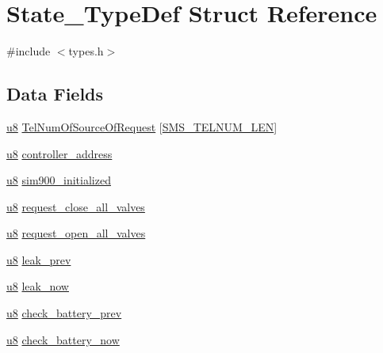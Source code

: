 \hypertarget{struct_state___type_def}{}\section{State\+\_\+\+Type\+Def Struct Reference}
\label{struct_state___type_def}


{\ttfamily \#include $<$types.\+h$>$}

\subsection*{Data Fields}
\begin{DoxyCompactItemize}
\item 
\hyperlink{types_8h_aed742c436da53c1080638ce6ef7d13de}{u8} \hyperlink{struct_state___type_def_aea371b8e2fc5d5672a74400e51c07082}{Tel\+Num\+Of\+Source\+Of\+Request} \mbox{[}\hyperlink{types_8h_a5e892833bdd80f5cb5cb76edc5cfa7e1}{S\+M\+S\+\_\+\+T\+E\+L\+N\+U\+M\+\_\+\+L\+E\+N}\mbox{]}
\item 
\hyperlink{types_8h_aed742c436da53c1080638ce6ef7d13de}{u8} \hyperlink{struct_state___type_def_aa213b6c0056af4acf9d9822500268845}{controller\+\_\+address}
\item 
\hyperlink{types_8h_aed742c436da53c1080638ce6ef7d13de}{u8} \hyperlink{struct_state___type_def_ad835df12f253f7af0950569385d10f81}{sim900\+\_\+initialized}
\item 
\hyperlink{types_8h_aed742c436da53c1080638ce6ef7d13de}{u8} \hyperlink{struct_state___type_def_a60d935b4b3b64b197fcc297d3acd6cb3}{request\+\_\+close\+\_\+all\+\_\+valves}
\item 
\hyperlink{types_8h_aed742c436da53c1080638ce6ef7d13de}{u8} \hyperlink{struct_state___type_def_a3a3570de9c4c52156ee1bfeabf813aa3}{request\+\_\+open\+\_\+all\+\_\+valves}
\item 
\hyperlink{types_8h_aed742c436da53c1080638ce6ef7d13de}{u8} \hyperlink{struct_state___type_def_aa167dc6fdc2b1bc25006ac551d641f3c}{leak\+\_\+prev}
\item 
\hyperlink{types_8h_aed742c436da53c1080638ce6ef7d13de}{u8} \hyperlink{struct_state___type_def_a2e6ddafab1772039a1c3e2f8902a50bd}{leak\+\_\+now}
\item 
\hyperlink{types_8h_aed742c436da53c1080638ce6ef7d13de}{u8} \hyperlink{struct_state___type_def_a21e7075e9496f30d865d7aa6035bea77}{check\+\_\+battery\+\_\+prev}
\item 
\hyperlink{types_8h_aed742c436da53c1080638ce6ef7d13de}{u8} \hyperlink{struct_state___type_def_af37e06b0479230eacf959355ed36fc94}{check\+\_\+battery\+\_\+now}

\end{DoxyCompactItemize}
